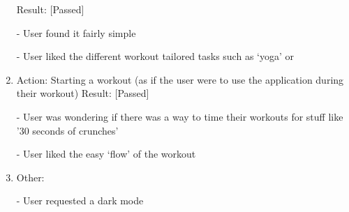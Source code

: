 \documentclass[12pt, titlepage]{article}
\begin{document}
\begin{enumerate}
Result: [Passed]

-	User found it fairly simple

-	User liked the different workout tailored tasks such as ‘yoga’ or 


\item Action: Starting a workout (as if the user were to use the application during their workout)
Result:  [Passed]

-	User was wondering if there was a way to time their workouts for stuff like ’30 seconds of crunches’

-	User liked the easy ‘flow’ of the workout

\item Other: 

- User requested a dark mode

\end{enumerate}
\end{document}
